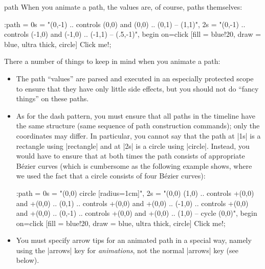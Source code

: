 \begin{tikzanimateattribute}{path}
    When you animate a path, the values are, of course, paths themselves:
\begin{codeexample}[imagesource={standalone/pgfmanual-en-tikz-animations-animation-31.svg}]
\tikz \node :path = {
        0s = "{(0,-1) .. controls (0,0) and (0,0)   .. (0,1) -- (1,1)}",
        2s = "{(0,-1) .. controls (-1,0) and (-1,0) .. (-1,1) -- (.5,-1)}",
        begin on=click }
  [fill = blue!20, draw = blue, ultra thick, circle] {Click me!};
\end{codeexample}
    There a number of things to keep in mind when you animate a path:
    \begin{itemize}
        \item The path ``values'' are parsed and executed in an especially
            protected scope to ensure that they have only little side effects,
            but you should not do ``fancy things'' on these paths.
        \item As for the dash pattern, you must ensure that all paths in the
            timeline have the same structure (same sequence of path
            construction commands); only the coordinates may differ. In
            particular, you cannot say that the path at |1s| is a rectangle
            using |rectangle| and at |2s| is a circle using |circle|. Instead,
            you would have to ensure that at both times the path consists of
            appropriate Bézier curves (which is cumbersome as the following
            example shows, where we used the fact that a circle consists of
            four Bézier curves):
\begin{codeexample}[imagesource={standalone/pgfmanual-en-tikz-animations-animation-32.svg}]
\tikz \node :path = {
        0s = "{(0,0) circle [radius=1cm]}",
        2s = "{(0,0)
               (1,0) .. controls +(0,0) and +(0,0) .. (0,1)
                     .. controls +(0,0) and +(0,0) .. (-1,0)
                     .. controls +(0,0) and +(0,0) .. (0,-1)
                     .. controls +(0,0) and +(0,0) .. (1,0)
                     -- cycle (0,0)}",
        begin on=click}
  [fill = blue!20, draw = blue, ultra thick, circle] {Click me!};
\end{codeexample}
        \item You must specify arrow tips for an animated path in a special
            way, namely using the |arrows| key for \emph{animations}, not the
            normal |arrows| key (see below).
    \end{itemize}
\end{tikzanimateattribute}

